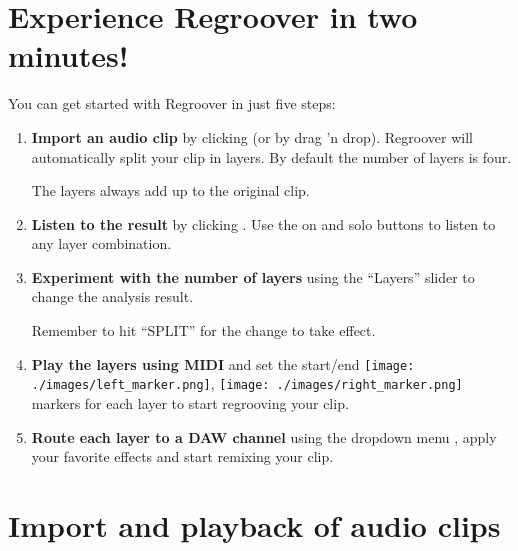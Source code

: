 \documentclass[12pt]{article}
\newcommand{\textimage}[3]{
\raisebox{#1}{\texttt{[image: \#3]}}
}
\begin{document}
\section*{Experience Regroover in two minutes!}
You can get started with Regroover in just five steps:
\begin{enumerate}
\item \textbf{Import an audio clip} by clicking \textimage{-7pt}{0.8}{./images/select_clip2.png} (or by drag 'n drop). Regroover will automatically split your clip in layers. By default the number of layers is four. 
\begin{mdframed}[style = info]
The layers always add up to the original clip. 
\end{mdframed}
\item \textbf{Listen to the result} by clicking \textimage{-7pt}{0.8}{./images/preview_button.png}. Use the on \textimage{-5pt}{1}{./images/layer_on.png} and solo \textimage{-5pt}{1}{./images/layer_solo.png} buttons to listen to any layer combination.
\item \textbf{Experiment with the number of layers} using the ``Layers'' slider to change the analysis result.
\begin{mdframed}[style = info]
 Remember to hit ``SPLIT'' for the change to take effect.
\end{mdframed}
\item \textbf{Play the layers using MIDI} and set the start/end \texttt{[image: ./images/left\_marker.png]}, \texttt{[image: ./images/right\_marker.png]} markers for each layer to start regrooving your clip.
\item \textbf{Route each layer to a DAW channel} using the dropdown menu \textimage{-3pt}{0.8}{./images/layer_out.png}, apply your favorite effects and start remixing your clip.
\end{enumerate}

\section*{Import and playback of audio clips}
\end{document}
